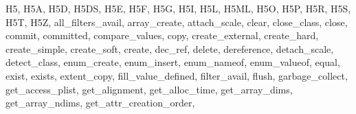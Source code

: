 {{        %
        H5,
        H5A,
        H5D,
        H5DS,
        H5E,
        H5F,
        H5G,
        H5I,
        H5L,
        H5ML,
        H5O,
        H5P,
        H5R,
        H5S,
        H5T,
        H5Z,
        all_filters_avail,%
        array_create,%
        attach_scale,%
        clear,%
        close_class,%
        close,%
        commit,%
        committed,%
        compare_values,%
        copy,%
        create_external,%
        create_hard,%
        create_simple,%
        create_soft,%
        create,%
        dec_ref,%
        delete,%
        dereference,%
        detach_scale,%
        detect_class,%
        enum_create,%
        enum_insert,%
        enum_nameof,%
        enum_valueof,%
        equal,%
        exist,%
        exists,%
        extent_copy,%
        fill_value_defined,%
        filter_avail,%
        flush,%
        garbage_collect,%
        get_access_plist,%
        get_alignment,%
        get_alloc_time,%
        get_array_dims,%
        get_array_ndims,%
        get_attr_creation_order,%
}}
